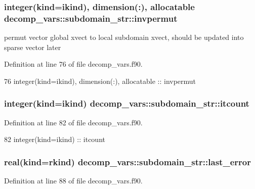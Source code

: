 \subsubsection[{invpermut}]{\setlength{\rightskip}{0pt plus 5cm}integer(kind=ikind), dimension(\+:), allocatable decomp\+\_\+vars\+::subdomain\+\_\+str\+::invpermut}\label{structdecomp__vars_1_1subdomain__str_af7191880d3019ecff9ac080a077f93ac}


permut vector global xvect to local subdomain xvect, should be updated into sparse vector later 



Definition at line 76 of file decomp\+\_\+vars.\+f90.


\begin{DoxyCode}
76     \textcolor{keywordtype}{integer(kind=ikind)}, \textcolor{keywordtype}{dimension(:)}, \textcolor{keywordtype}{allocatable} :: invpermut
\end{DoxyCode}
\subsubsection[{itcount}]{\setlength{\rightskip}{0pt plus 5cm}integer(kind=ikind) decomp\+\_\+vars\+::subdomain\+\_\+str\+::itcount}\label{structdecomp__vars_1_1subdomain__str_af36d3fd4f0b7843d1778ed6f015e4aed}


Definition at line 82 of file decomp\+\_\+vars.\+f90.


\begin{DoxyCode}
82     \textcolor{keywordtype}{integer(kind=ikind)} :: itcount
\end{DoxyCode}
\subsubsection[{last\+\_\+error}]{\setlength{\rightskip}{0pt plus 5cm}real(kind=rkind) decomp\+\_\+vars\+::subdomain\+\_\+str\+::last\+\_\+error}\label{structdecomp__vars_1_1subdomain__str_aad1673adf224d1960b35191bf46c4b85}


Definition at line 88 of file decomp\+\_\+vars.\+f90.


